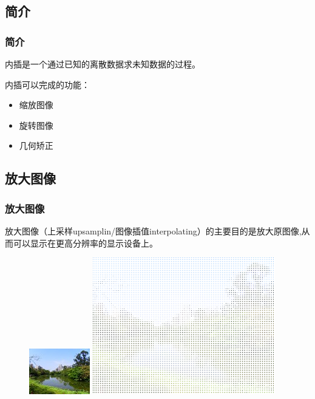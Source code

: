 \documentclass[notheorems,serif,table,compress]{beamer}  %
\begin{document}
\subsection{简介}
\begin{frame}[fragile]
\frametitle{简介}
    内插是一个通过已知的离散数据求未知数据的过程。

    内插可以完成的功能：	
	\begin{itemize}
	\item 缩放图像
	\item 旋转图像
	\item 几何矫正
    	\end{itemize}
\end{frame}

\subsection{放大图像}
\begin{frame}
\frametitle{放大图像}
    放大图像（上采样upsamplin/图像插值interpolating）的主要目的是放大原图像,从而可以显示在更高分辨率的显示设备上。
\begin{figure}
        \begin{minipage}[t]{0.4\linewidth}
        \centering
        \includegraphics[width=0.3\linewidth]{template.png} 
        \end{minipage}
        \begin{minipage}[t]{0.4\linewidth}
        \centering
        \includegraphics[width=1\linewidth]{template1.png} 
        \end{minipage}
    \end{figure}
\end{frame}
 
\end{document}
